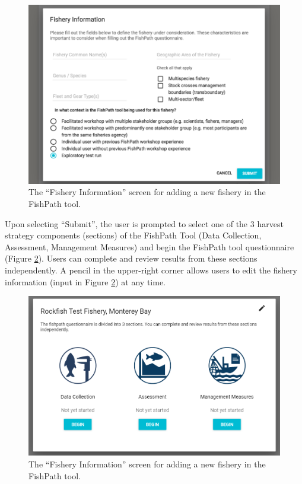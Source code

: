 \documentclass[11pt,]{book}
\begin{document}
\begin{figure}

{\centering \includegraphics[width=0.95\linewidth]{images/fishery-info-screen} 

}

\caption{The “Fishery Information” screen for adding a new fishery in the FishPath tool.}\label{fig:fishery-info}
\end{figure}

Upon selecting ``Submit'', the user is prompted to select one of the 3 harvest strategy components (sections) of the FishPath Tool (Data Collection, Assessment, Management Measures) and begin the FishPath tool questionnaire (Figure \ref{fig:fishery-entry}). Users can complete and review results from these sections independently. A pencil in the upper-right corner allows users to edit the fishery information (input in Figure \ref{fig:fishery-entry}) at any time.

\begin{figure}

{\centering \includegraphics[width=0.95\linewidth]{images/fishery-entry-screen} 

}

\caption{The “Fishery Information” screen for adding a new fishery in the FishPath tool.}\label{fig:fishery-entry}
\end{figure}
\end{document}
